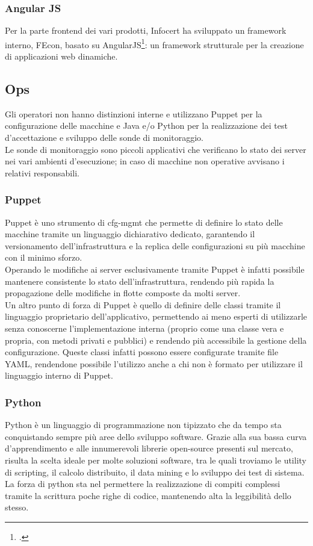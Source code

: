 \subsubsection{Angular JS}
Per la parte frontend dei vari prodotti, Infocert ha sviluppato un \gls{framework} interno, FEcon, basato su AngularJS\footcite{site:angular}: un \gls{framework} strutturale per la creazione di applicazioni web dinamiche.
\subsection{Ops}
Gli operatori non hanno distinzioni interne e utilizzano Puppet per la configurazione delle macchine e Java e/o Python per la realizzazione dei test d'accettazione e sviluppo delle sonde di monitoraggio. \\
Le sonde di monitoraggio sono piccoli applicativi che verificano lo stato dei server nei vari ambienti d'esecuzione; in caso di macchine non operative avvisano i relativi responsabili.
\subsubsection{Puppet}
Puppet è uno strumento di \gls{cfg-mgmt} che permette di definire lo stato delle macchine tramite un linguaggio dichiarativo dedicato, garantendo il versionamento dell'infrastruttura e la replica delle configurazioni su più macchine con il minimo sforzo. \\
Operando le modifiche ai server esclusivamente tramite Puppet è infatti possibile mantenere consistente lo stato dell'infrastruttura, rendendo più rapida la propagazione delle modifiche in flotte composte da molti server. \\
Un altro punto di forza di Puppet è quello di definire delle classi tramite il linguaggio proprietario dell'applicativo, permettendo ai meno esperti di utilizzarle senza conoscerne l'implementazione interna (proprio come una classe vera e propria, con metodi privati e pubblici) e rendendo più accessibile la gestione della configurazione. Queste classi infatti possono essere configurate tramite file YAML, rendendone possibile l'utilizzo anche a chi non è formato per utilizzare il linguaggio interno di Puppet.
\subsubsection{Python}
Python è un linguaggio di programmazione non tipizzato che da tempo sta conquistando sempre più aree dello sviluppo software. Grazie alla sua bassa curva d'apprendimento e alle innumerevoli librerie open-source presenti sul mercato, risulta la scelta ideale per molte soluzioni software, tra le quali troviamo le utility di scripting, il calcolo distribuito, il data mining e lo sviluppo dei test di sistema. \\
La forza di python sta nel permettere la realizzazione di compiti complessi tramite la scrittura poche righe di codice, mantenendo alta la leggibilità dello stesso. \\